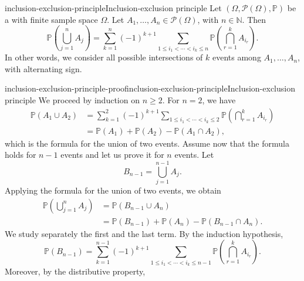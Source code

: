 \documentclass[preview]{standalone}
\begin{document}
\begin{snippettheorem}{inclusion-exclusion-principle}{Inclusion-exclusion principle}
    Let \((\Omega, \mathcal{P}(\Omega), \mathbb{P})\)
    be a \probabilityspace with finite sample space \(\Omega\).
    Let \(A_1, \ldots, A_n \in \mathcal{P}(\Omega)\), with
    \(n \in \mathbb{N}\). Then
    \[
        \mathbb{P}\left(
            \bigcup_{j=1}^{n} A_j
        \right)
        =
        \sum_{k=1}^{n}
        (-1)^{k+1}
        \sum_{1 \leq i_1 < \cdots < i_k \leq n}
        \mathbb{P}\left(
            \bigcap_{r=1}^{k} A_{i_r}
        \right).
    \]
    In other words, we consider all possible intersections
    of \(k\) events among \(A_1, \ldots, A_n\), with alternating sign.
\end{snippettheorem}

\begin{snippetproof}{inclusion-exclusion-principle-proof}{inclusion-exclusion-principle}{Inclusion-exclusion principle}
    We proceed by induction on \(n \geq 2\).
    For \(n=2\), we have
    \begin{align*}
        \mathbb{P}(A_1 \cup A_2)
        &=
        \sum_{k=1}^{2}
        (-1)^{k+1}
        \sum_{1 \leq i_1 < \cdots < i_k \leq 2}
        \mathbb{P}\left(
            \bigcap_{r=1}^{k} A_{i_r}
        \right)
        \\
        &=
        \mathbb{P}(A_1)
        +
        \mathbb{P}(A_2)
        -
        \mathbb{P}(A_1 \cap A_2),
    \end{align*}
    which is the formula for the union of two events.
    Assume now that the formula holds for \(n-1\) events
    and let us prove it for \(n\) events.
    Let
    \[
        B_{n-1}
        =
        \bigcup_{j=1}^{n-1} A_j.
    \]
    Applying the formula for the union of two events, we obtain
    \begin{align*}
        \mathbb{P}\left(
            \bigcup_{j=1}^{n} A_j
        \right)
        &=
        \mathbb{P}(B_{n-1} \cup A_n)
        \\
        &=
        \mathbb{P}(B_{n-1})
        +
        \mathbb{P}(A_n)
        -
        \mathbb{P}(B_{n-1} \cap A_n).
    \end{align*}
    We study separately the first and the last term.
    By the induction hypothesis,
    \[
        \mathbb{P}(B_{n-1})
        =
        \sum_{k=1}^{n-1}
        (-1)^{k+1}
        \sum_{1 \leq i_1 < \cdots < i_k \leq n-1}
        \mathbb{P}\left(
            \bigcap_{r=1}^{k} A_{i_r}
        \right).
    \]
    Moreover, by the distributive property,

\end{snippetproof}
\end{document}
